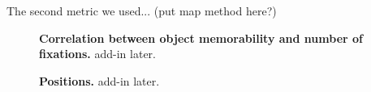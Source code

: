 The second metric we used... (put map method here?)

\begin{figure}[t]
\centering
{}
\vspace{-5mm}\caption{\footnotesize\textbf{Correlation between object memorability and number of fixations.} add-in later. }\label{fig:exampleStimuli}
\end{figure} 

\begin{figure}[t]
\centering
{}
\vspace{-5mm}\caption{\footnotesize\textbf{Positions.} add-in later. }\label{fig:exampleStimuli}
\end{figure} 